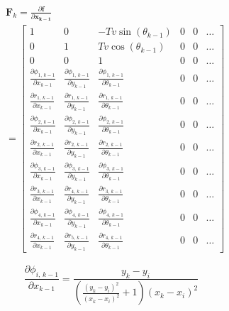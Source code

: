 \documentclass{ieeeaccess}
\begin{document}
	\begin{equation}
	\label{eq:Fsys}
	\begin{aligned}
		&\boldsymbol{F}_{k} = \frac{\partial\boldsymbol{f}}{\partial\boldsymbol{x_{k-1}}}	\\
		& =
		\begin{bmatrix}
			1	&0	&-Tv\sin{\left(\theta_{k-1}\right)}	&0	&0	&\dots	\\
			0	&1	&Tv\cos{\left(\theta_{k-1}\right)}	&0	&0	&\dots	\\
			0	&0	&1						&0	&0	&\dots	\\
			\frac{\partial\phi_{1,\,k-1}}{\partial x_{k-1}}	&\frac{\partial\phi_{1,\,k-1}}{\partial y_{k-1}}	&\frac{\partial\phi_{1,\,k-1}}{\partial \theta_{k-1}}	&0	&0	&\dots	\\
			\frac{\partial r_{1,\,k-1}}{\partial x_{k-1}}	&\frac{\partial r_{1,\,k-1}}{\partial y_{k-1}}	&\frac{\partial r_{1,\,k-1}}{\partial \theta_{k-1}}	&0	&0	&\dots	\\
			\frac{\partial\phi_{2,\,k-1}}{\partial x_{k-1}}	&\frac{\partial\phi_{2,\,k-1}}{\partial y_{k-1}}	&\frac{\partial\phi_{2,\,k-1}}{\partial \theta_{k-1}}	&0	&0	&\dots	\\
			\frac{\partial r_{2,\,k-1}}{\partial x_{k-1}}	&\frac{\partial r_{2,\,k-1}}{\partial y_{k-1}}	&\frac{\partial r_{2,\,k-1}}{\partial \theta_{k-1}}	&0	&0	&\dots	\\
			\frac{\partial\phi_{3,\,k-1}}{\partial x_{k-1}}	&\frac{\partial\phi_{3,\,k-1}}{\partial y_{k-1}}	&\frac{\partial\phi_{3,\,k-1}}{\partial \theta_{k-1}}	&0	&0	&\dots	\\
			\frac{\partial r_{3,\,k-1}}{\partial x_{k-1}}	&\frac{\partial r_{4,\,k-1}}{\partial y_{k-1}}	&\frac{\partial r_{3,\,k-1}}{\partial \theta_{k-1}}	&0	&0	&\dots	\\
			\frac{\partial\phi_{4,\,k-1}}{\partial x_{k-1}}	&\frac{\partial\phi_{4,\,k-1}}{\partial y_{k-1}}	&\frac{\partial\phi_{4,\,k-1}}{\partial \theta_{k-1}}	&0	&0	&\dots	\\
			\frac{\partial r_{4,\,k-1}}{\partial x_{k-1}}	&\frac{\partial r_{5,\,k-1}}{\partial y_{k-1}}	&\frac{\partial r_{4,\,k-1}}{\partial \theta_{k-1}}	&0	&0	&\dots
		\end{bmatrix}
	\end{aligned}
	\end{equation}
	
	\begin{equation}
	\label{eq:derphix}
		\frac{\partial \phi_{i,\,k-1}}{\partial x_{k-1}} = \frac{y_{k}-y_{i}}{\left(\frac{\left(y_{k}-y_{i}\right)^{2}}{\left(x_{k}-x_{i}\right)^{2}}+1\right)\left(x_{k}-x_{i}\right)^{2}}
	\end{equation}
	
\end{document}
